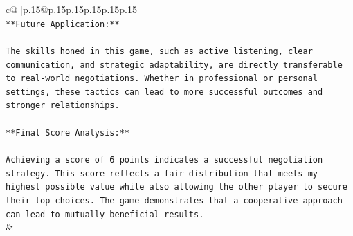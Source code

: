 \documentclass{article}
\begin{document}
{\begin{supertabular}{c@{$\;$}|p{.15\linewidth}@{}p{.15\linewidth}p{.15\linewidth}p{.15\linewidth}p{.15\linewidth}p{.15\linewidth}}
{{{\\ 
\texttt{**Future Application:**} \\
\\ 
\texttt{The skills honed in this game, such as active listening, clear communication, and strategic adaptability, are directly transferable to real{-}world negotiations. Whether in professional or personal settings, these tactics can lead to more successful outcomes and stronger relationships.} \\
\\ 
\texttt{**Final Score Analysis:**} \\
\\ 
\texttt{Achieving a score of 6 points indicates a successful negotiation strategy. This score reflects a fair distribution that meets my highest possible value while also allowing the other player to secure their top choices. The game demonstrates that a cooperative approach can lead to mutually beneficial results.} \\
            }
        }
    }
    & \\ \\


\end{supertabular}}
\end{document}
